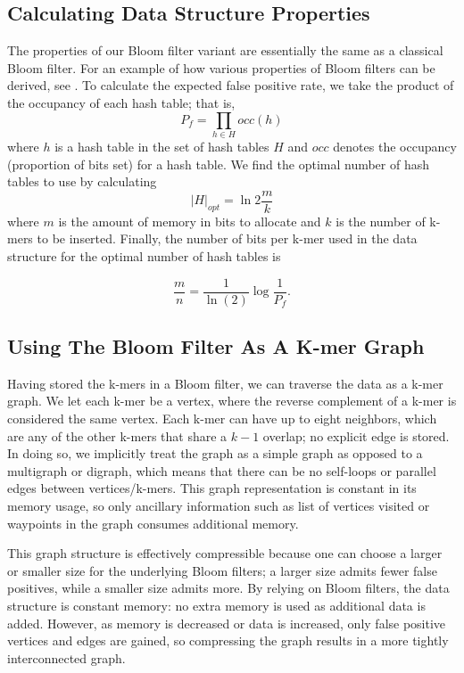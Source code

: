 \documentclass[12pt]{article} \usepackage{simplemargins}
\begin{document}
\subsection{Calculating Data Structure Properties}
The properties of our Bloom filter variant are essentially the
same as a classical Bloom filter. For an example of how various 
properties of Bloom filters can be derived, see \cite{bloomsurvey}. 
To calculate the expected false positive 
rate, we
take the product of the occupancy of each hash table; that is,
\begin{displaymath}
P_f = \prod_{h \in H} occ(h)
\end{displaymath}
where $h$ is a hash table in the set of hash tables $H$ and $occ$ denotes
the occupancy (proportion of bits set) for a hash table.
We find the optimal number of hash tables
to use by calculating
\begin{displaymath}
\vert H \vert_{opt} = \ln 2 \frac{m}{k}
\end{displaymath}
where $m$ is the amount of memory in bits to allocate and $k$
is the number of k-mers to be inserted. Finally,
the number of bits per
k-mer used in the data structure for the optimal number of hash 
tables is

\begin{displaymath}
\frac{m}{n} = \frac{1}{\ln(2)} \log{\frac{1}{P_f}}.
\end{displaymath}

\subsection{Using The Bloom Filter As A K-mer Graph}
Having stored the k-mers in a Bloom filter, we can traverse
the data as a k-mer graph. We let each k-mer be a vertex, where
the reverse complement of a k-mer is considered the same
vertex. Each k-mer can
have up to eight neighbors, which are any of the other k-mers that
 share a $k-1$
overlap; no explicit edge is stored. In doing so, we implicitly 
treat the graph as a simple graph as opposed to a multigraph or 
digraph, which means that there can be no self-loops or parallel 
edges between vertices/k-mers. This graph representation is constant 
in its memory usage, so only ancillary information such as list 
of vertices visited or waypoints in the graph consumes additional 
memory.

This graph structure is effectively compressible
because one can choose a larger
or smaller size for the underlying Bloom filters; a larger size admits fewer
false positives, while a smaller size admits more. By relying on Bloom
filters, the data structure is constant memory: no extra memory is
used as additional data is added. However, as memory is decreased or data
is increased, only false positive vertices and edges are gained, so
compressing the graph results in a more tightly interconnected graph.
\end{document}
